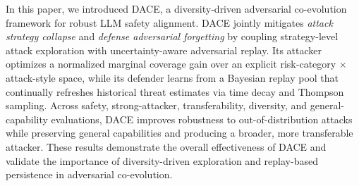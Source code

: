 \documentclass{article}
\newcommand{\method}{\textsc{DACE}\xspace}
\begin{document}
In this paper, we introduced \method, a diversity-driven adversarial co-evolution framework for robust LLM safety alignment. \method jointly mitigates \emph{attack strategy collapse} and \emph{defense adversarial forgetting} by coupling strategy-level attack exploration with uncertainty-aware adversarial replay. Its attacker optimizes a normalized marginal coverage gain over an explicit risk-category $\times$ attack-style space, while its defender learns from a Bayesian replay pool that continually refreshes historical threat estimates via time decay and Thompson sampling. Across safety, strong-attacker, transferability, diversity, and general-capability evaluations, \method improves robustness to out-of-distribution attacks while preserving general capabilities and producing a broader, more transferable attacker. These results demonstrate the overall effectiveness of \method and validate the importance of diversity-driven exploration and replay-based persistence in adversarial co-evolution.
\end{document}
